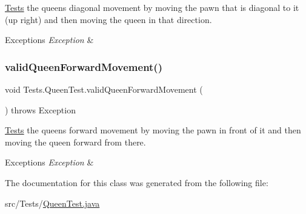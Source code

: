 \hyperlink{namespace_tests}{Tests} the queen\textquotesingle{}s diagonal movement by moving the pawn that is diagonal to it (up right) and then moving the queen in that direction. 
\begin{DoxyExceptions}{Exceptions}
{\em Exception} & \\
\hline
\end{DoxyExceptions}
\hypertarget{class_tests_1_1_queen_test_a8bec252c50587e572eaf3d36fb719d6f}{}\label{class_tests_1_1_queen_test_a8bec252c50587e572eaf3d36fb719d6f} 
\subsubsection{\texorpdfstring{valid\+Queen\+Forward\+Movement()}{validQueenForwardMovement()}}
{\footnotesize\ttfamily void Tests.\+Queen\+Test.\+valid\+Queen\+Forward\+Movement (\begin{DoxyParamCaption}{ }\end{DoxyParamCaption}) throws Exception}

\hyperlink{namespace_tests}{Tests} the queen\textquotesingle{}s forward movement by moving the pawn in front of it and then moving the queen forward from there. 
\begin{DoxyExceptions}{Exceptions}
{\em Exception} & \\
\hline
\end{DoxyExceptions}


The documentation for this class was generated from the following file\+:\begin{DoxyCompactItemize}
\item 
src/\+Tests/\hyperlink{_queen_test_8java}{Queen\+Test.\+java}\end{DoxyCompactItemize}
